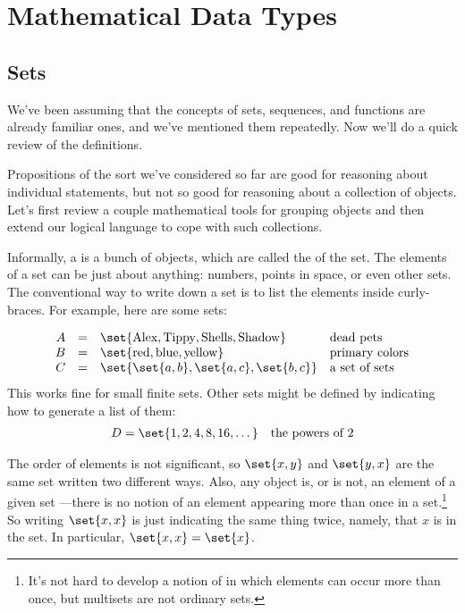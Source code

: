 \chapter{Mathematical Data Types}\label{data_chap}

\newcommand{\inchrg}{\text{chrg}}
\newcommand{\facdom}{\text{Fac}}
\newcommand{\subnums}{\text{SubNums}}
\newcommand{\introsub}{\text{Intro}}


\section{Sets}
We've been assuming that the concepts of sets, sequences, and functions are
already familiar ones, and we've mentioned them repeatedly.  Now we'll do a
quick review of the definitions.

\begin{editingnotes}
Propositions of the sort we've considered so far are good for
reasoning about individual statements, but not so good for reasoning
about a collection of objects.  Let's first review a couple
mathematical tools for grouping objects and then extend our logical
language to cope with such collections.
\end{editingnotes}

Informally, a  is a bunch of objects, which are called the
 of the set.  The elements of a set can be just about
anything: numbers, points in space, or even other sets.  The conventional
way to write down a set is to list the elements inside curly-braces.  For
example, here are some sets:

\[
\begin{array}{rcll}
A & = & \set{\text{Alex}, \text{Tippy}, \text{Shells}, \text{Shadow}} & \text{dead pets} \\
B & = & \set{\text{red}, \text{blue}, \text{yellow}} & \text{primary colors} \\
C & = & \set{ \set{a, b}, \set{a, c}, \set{b, c}} & \text{a set of sets}
\end{array}
\]
This works fine for small finite sets.  Other sets might be defined by
indicating how to generate a list of them:
\begin{align*}
D & =  \set{1,2,4,8,16,\dots} & \text{the powers of 2}
\end{align*}

The order of elements is not significant, so $\set{x, y}$ and $\set{y, x}$
are the same set written two different ways.  Also, any object is, or is
not, an element of a given set ---there is no notion of an element
appearing more than once in a set.\footnote{It's not hard to develop a
notion of  in which elements can occur more than once, but
multisets are not ordinary sets.}  So writing $\set{x,x}$ is just
indicating the same thing twice, namely, that $x$ is in the set.  In
particular, $\set{x,x} = \set{x}$.

